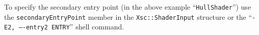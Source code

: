 \documentclass{article}
\begin{document}
To specify the secondary entry point (in the above example ``\texttt{HullShader}'') use the
\texttt{secondaryEntryPoint} member in the \texttt{Xsc::ShaderInput} structure
or the ``\texttt{-E2, ----entry2 ENTRY}'' shell command.










\end{document}
